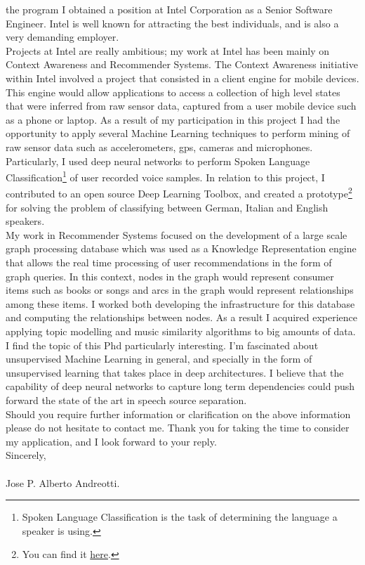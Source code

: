 \documentclass[letter,12pt,english]{article}
\begin{document}
the program I obtained a position at Intel Corporation as a Senior Software Engineer. 
Intel is well known for attracting the best individuals, and is also a very demanding employer.
\\
Projects at Intel are really ambitious; my work at Intel has been mainly on Context Awareness and 
Recommender Systems. The Context Awareness initiative within Intel involved a project that consisted
in a client engine for mobile devices. This engine would allow applications to access a collection 
of high level states that were inferred from raw sensor data, captured from a user mobile device such
as a phone or laptop.
As a result of my participation in this project I had the opportunity to apply several Machine Learning
techniques to perform mining of raw sensor data such as accelerometers, gps, cameras and microphones.\\
Particularly, I used deep neural networks to perform Spoken Language Classification\footnote{Spoken Language Classification
is the task of determining the language a speaker is using.} of user recorded voice samples. In relation to this project, I contributed to an 
open source Deep Learning Toolbox, and created a prototype\footnote{You can find it
\href{https://github.com/albertoandreottiATgmail/DeepLearnToolbox/tree/langIdent}{here}.}
for solving the problem of classifying between German, Italian and English speakers.  
\\
My work in Recommender Systems focused on the development of a large scale graph processing database which 
was used as a Knowledge Representation engine that allows the real time processing of user recommendations in 
the form of graph queries. In this context, nodes in the graph would represent consumer items such as books or 
songs and arcs in the graph would represent relationships among these items. I worked both developing the 
infrastructure for this database and computing the relationships between nodes. As a result I acquired experience
applying topic modelling and music similarity algorithms to big amounts of data.
\\
I find the topic of this Phd particularly interesting. I'm fascinated about unsupervised Machine Learning in general,
and specially in the form of unsupervised learning that takes place in deep architectures. I believe that the capability
of deep neural networks to capture long term dependencies could push forward the state of the art in speech source separation.\\
Should you require further information or clarification on the above information please do not hesitate to contact me.
Thank you for taking the time to consider my application, and I look forward to your reply.
\\

Sincerely,
\\
\\
Jose P. Alberto Andreotti.
\end{document}
